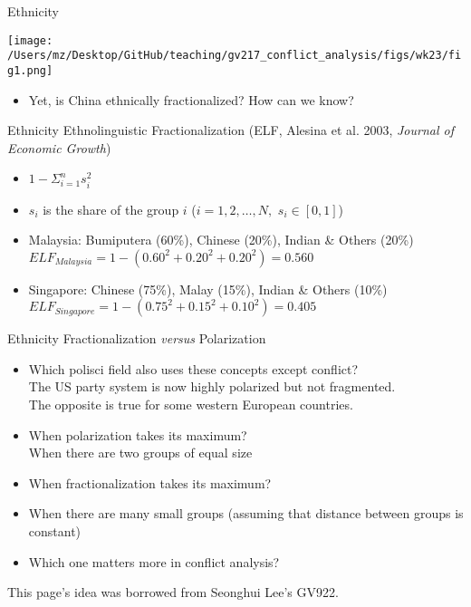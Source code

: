 \documentclass[handout]{beamer}
\begin{document}
\begin{frame}{Ethnicity}
    \pause
    \begin{center}
        \texttt{[image: /Users/mz/Desktop/GitHub/teaching/gv217\_conflict\_analysis/figs/wk23/fig1.png]}
    \end{center}
    \begin{itemize}
        \pause\item Yet, is China ethnically fractionalized? How can we know?    
    \end{itemize}
\end{frame}

\begin{frame}{Ethnicity}
    \pause Ethnolinguistic Fractionalization (ELF, Alesina et al. 2003, \textit{Journal of Economic Growth})
    \begin{itemize}
        \pause\item \(1 - \Sigma_{i = 1}^{n} s_{i}^2\)
        \pause\item \(s_{i}\) is the share of the group \(i\) (\(i = 1, 2, \ldots, N, \) \(s_{i} \in [0, 1]\))
        \pause\item Malaysia: Bumiputera (60\%), Chinese (20\%), Indian \& Others (20\%)
        \pause      \(ELF_{Malaysia} = 1 - (0.60^2 + 0.20^2 + 0.20^2) = 0.560\)
        \pause\item Singapore: Chinese (75\%), Malay (15\%), Indian \& Others (10\%)
        \pause      \(ELF_{Singapore} = 1 - (0.75^2 + 0.15^2 + 0.10^2) = 0.405\)
    \end{itemize}
\end{frame}

\begin{frame}{Ethnicity}
    \pause Fractionalization \textit{versus} Polarization
    \begin{itemize}
        \pause\item Which polisci field also uses these concepts except conflict?\\
        \pause      The US party system is now highly polarized but not fragmented.\\
        \pause      The opposite is true for some western European countries.
        \pause\item When polarization takes its maximum?\\
        \pause      When there are two groups of equal size
        \pause\item When fractionalization takes its maximum?\\
        \pause\item When there are many small groups (assuming that distance between groups is constant)
        \pause\item Which one matters more in conflict analysis?
\end{itemize}
\vfill
\tiny This page's idea was borrowed from Seonghui Lee's GV922.
\end{frame}
\end{document}
